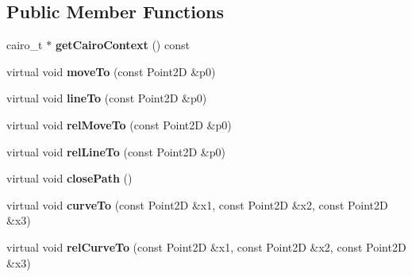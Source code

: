 \subsection*{Public Member Functions}
\begin{DoxyCompactItemize}
\item 
\hypertarget{classsambag_1_1disco_1_1_cairo_draw_context_a2cee718c80145774ab4f7961060b5448}{
cairo\_\-t $\ast$ {\bfseries getCairoContext} () const }
\label{classsambag_1_1disco_1_1_cairo_draw_context_a2cee718c80145774ab4f7961060b5448}

\item 
\hypertarget{classsambag_1_1disco_1_1_cairo_draw_context_a1115169b1e734c5d78b8712edfbd963a}{
virtual void {\bfseries moveTo} (const Point2D \&p0)}
\label{classsambag_1_1disco_1_1_cairo_draw_context_a1115169b1e734c5d78b8712edfbd963a}

\item 
\hypertarget{classsambag_1_1disco_1_1_cairo_draw_context_af621fb2525f19011ad6a5b6173da9fa4}{
virtual void {\bfseries lineTo} (const Point2D \&p0)}
\label{classsambag_1_1disco_1_1_cairo_draw_context_af621fb2525f19011ad6a5b6173da9fa4}

\item 
\hypertarget{classsambag_1_1disco_1_1_cairo_draw_context_a481de64f1782d18ac3eec5606590e8f1}{
virtual void {\bfseries relMoveTo} (const Point2D \&p0)}
\label{classsambag_1_1disco_1_1_cairo_draw_context_a481de64f1782d18ac3eec5606590e8f1}

\item 
\hypertarget{classsambag_1_1disco_1_1_cairo_draw_context_adee4d08f15fca2e3fccf6486ebd5e23d}{
virtual void {\bfseries relLineTo} (const Point2D \&p0)}
\label{classsambag_1_1disco_1_1_cairo_draw_context_adee4d08f15fca2e3fccf6486ebd5e23d}

\item 
\hypertarget{classsambag_1_1disco_1_1_cairo_draw_context_a7aa3668596df43caeafa530c845ca8b8}{
virtual void {\bfseries closePath} ()}
\label{classsambag_1_1disco_1_1_cairo_draw_context_a7aa3668596df43caeafa530c845ca8b8}

\item 
\hypertarget{classsambag_1_1disco_1_1_cairo_draw_context_a4cf3f69ebb2dc2186d6ccbb45553d59b}{
virtual void {\bfseries curveTo} (const Point2D \&x1, const Point2D \&x2, const Point2D \&x3)}
\label{classsambag_1_1disco_1_1_cairo_draw_context_a4cf3f69ebb2dc2186d6ccbb45553d59b}

\item 
\hypertarget{classsambag_1_1disco_1_1_cairo_draw_context_a51182974df4d180b31e9005b4ac06a8e}{
virtual void {\bfseries relCurveTo} (const Point2D \&x1, const Point2D \&x2, const Point2D \&x3)}
\label{classsambag_1_1disco_1_1_cairo_draw_context_a51182974df4d180b31e9005b4ac06a8e}


\end{DoxyCompactItemize}
